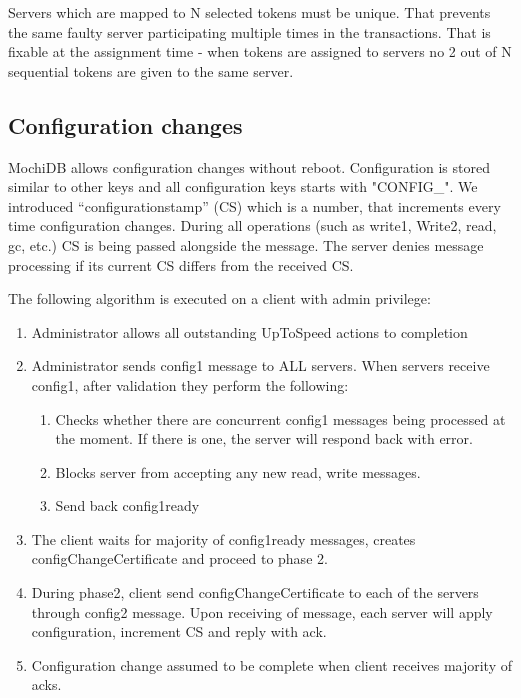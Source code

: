 \documentclass[letterpaper,twocolumn,10pt]{article}
\begin{document}
Servers which are mapped to N selected tokens must be unique. That prevents the same faulty server participating multiple times in the transactions. That is fixable at the assignment time - when tokens are assigned to servers no 2 out of N sequential tokens are given to the same server.

\subsection{Configuration changes}
MochiDB allows configuration changes without reboot. Configuration is stored similar to other keys and all configuration keys starts with "CONFIG\_". We introduced “configurationstamp” (CS) which is a number, that increments every time configuration changes. During all operations (such as write1, Write2, read, gc, etc.) CS is being passed alongside the message. The server denies message processing if its current CS differs from the received CS.

The following algorithm is executed on a client with admin privilege:
\begin{enumerate}[noitemsep, topsep=0pt,]
\item Administrator allows all outstanding {UpToSpeed} actions to completion
\item Administrator sends config1 message to ALL servers. When servers receive config1, after validation they perform the following:
 \begin{enumerate}[noitemsep, topsep=0pt,]
    \item Checks whether there are concurrent config1 messages being processed at the moment. If there is one, the server will respond back with error. 
    \item Blocks server from accepting any new read, write messages.
    \item Send back config1ready
\end{enumerate}
\item The client waits for majority of config1ready messages, creates configChangeCertificate and proceed to phase 2.
\item During phase2, client send configChangeCertificate to each of the servers through config2 message. Upon receiving of message, each server will apply configuration, increment CS and reply with ack.
\item Configuration change assumed to be complete when client receives majority of acks.
\end{enumerate}
\end{document}
